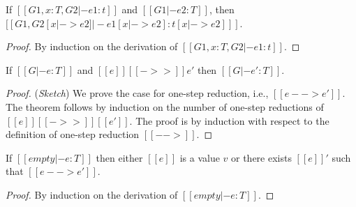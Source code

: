 \begin{lem}[Substitution]\label{lem:ecore:subst}
	If $[[G1, x:T, G2 |- e1:t]]$ and $[[G1 |- e2:T]]$, then $[[G1, G2 [x |-> e2]
|- e1[x |-> e2]  : t[x |-> e2] ]]$.
\end{lem}

\begin{proof}
    By induction on the derivation of $[[G1, x:T, G2 |- e1:t]]$.
\end{proof}

\begin{thm}\label{lem:ecore:reduct}
If $[[G |- e:T]]$ and $[[e]] [[->>]] e'$ then $[[G |- e':T]]$.
\end{thm}

\begin{proof}
    (\emph{Sketch}) We prove the case for one-step reduction, i.e., $[[e -->
e']]$. The theorem follows by induction on the number of one-step reductions
of $[[e]] [[->>]] [[e']]$.
    The proof is by induction with respect to the definition of one-step
reduction $[[-->]]$.
\end{proof}

\begin{thm}\label{lem:ecore:prog}
If $[[empty |- e:T]]$ then either $[[e]]$ is a value $v$ or there exists $[[e]]'$
such that $[[e --> e']]$.
\end{thm}

\begin{proof}
    By induction on the derivation of $[[empty |- e:T]]$.
\end{proof}
